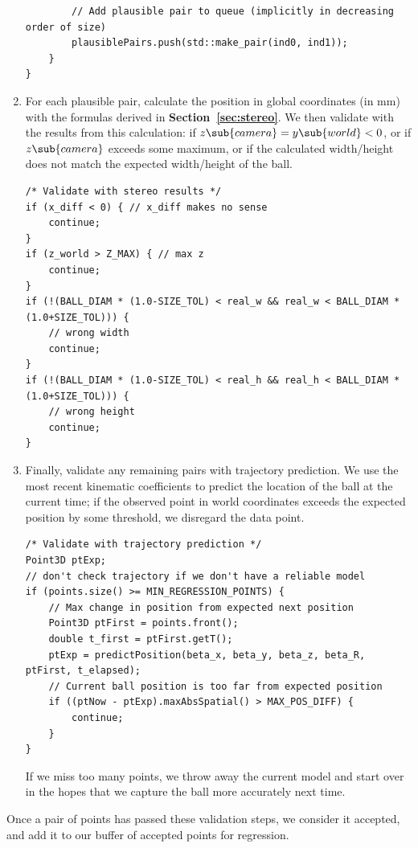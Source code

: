 \documentclass[letterpaper, 11pt]{article}
\newcommand*{\secref}[1]{\textbf{Section~\ref{#1}}}
\begin{document}
\begin{enumerate}[label=\textbf{Step \arabic*.}]
\begin{verbatim}
        // Add plausible pair to queue (implicitly in decreasing order of size)
        plausiblePairs.push(std::make_pair(ind0, ind1));
    }
}
        \end{verbatim}
    \item For each plausible pair, calculate the position in global coordinates (in mm) with the formulas derived in \secref{sec:stereo}. We then validate with the results from this calculation: if $z\sub{camera} = y\sub{world} < 0$, or if $z\sub{camera}$ exceeds some maximum, or if the calculated width/height does not match the expected width/height of the ball.
        \begin{verbatim}
/* Validate with stereo results */
if (x_diff < 0) { // x_diff makes no sense
    continue;
}
if (z_world > Z_MAX) { // max z
    continue;
}
if (!(BALL_DIAM * (1.0-SIZE_TOL) < real_w && real_w < BALL_DIAM * (1.0+SIZE_TOL))) {
    // wrong width
    continue;
}
if (!(BALL_DIAM * (1.0-SIZE_TOL) < real_h && real_h < BALL_DIAM * (1.0+SIZE_TOL))) {
    // wrong height
    continue;
}
        \end{verbatim}
    \item Finally, validate any remaining pairs with trajectory prediction. We use the most recent kinematic coefficients to predict the location of the ball at the current time; if the observed point in world coordinates exceeds the expected position by some threshold, we disregard the data point.
        \begin{verbatim}
/* Validate with trajectory prediction */
Point3D ptExp;
// don't check trajectory if we don't have a reliable model
if (points.size() >= MIN_REGRESSION_POINTS) {
    // Max change in position from expected next position
    Point3D ptFirst = points.front();
    double t_first = ptFirst.getT();
    ptExp = predictPosition(beta_x, beta_y, beta_z, beta_R, ptFirst, t_elapsed);
    // Current ball position is too far from expected position
    if ((ptNow - ptExp).maxAbsSpatial() > MAX_POS_DIFF) {
        continue;
    }
}
        \end{verbatim}
        If we miss too many points, we throw away the current model and start over in the hopes that we capture the ball more accurately next time.
\end{enumerate}

Once a pair of points has passed these validation steps, we consider it accepted, and add it to our buffer of accepted points for regression.
\end{document}
